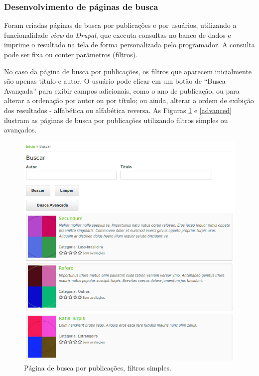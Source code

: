 \documentclass[a4paper]{article}
\begin{document}
\subsubsection{Desenvolvimento de páginas de busca}

Foram criadas páginas de busca por publicações e por usuários, utilizando a funcionalidade \textit{view} do \textit{Drupal}, que executa consultas no banco de dados e imprime o resultado na tela de forma personalizada pelo programador. A consulta pode ser fixa ou conter parâmetros (filtros). 

No caso da página de busca por publicações, os filtros que aparecem inicialmente são apenas título e autor. O usuário pode clicar em um botão de “Busca Avançada” para exibir campos adicionais, como o ano de publicação, ou para alterar a ordenação por autor ou por título; ou ainda, alterar a ordem de exibição dos resultados - alfabética ou alfabética reversa. As Figuras \ref{simple} e \ref{advanced} ilustram as páginas de busca por publicações utilizando filtros simples ou avançados.

\begin{figure}[pbth!]
\centering
\includegraphics[width=120mm]{img/browse-simple.png}
\caption{Página de busca por publicações, filtros simples.\label{simple}}
\end{figure}
\end{document}
